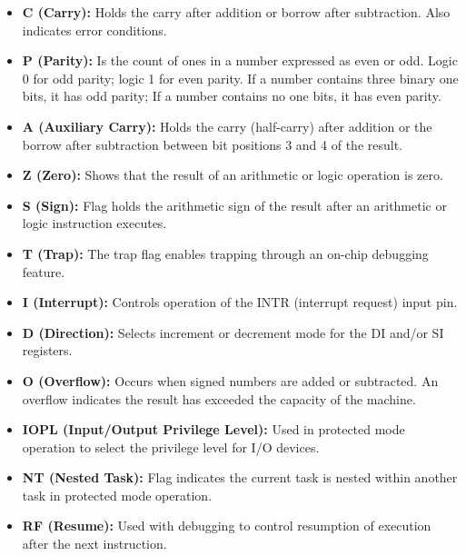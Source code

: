 \documentclass{article}
\begin{document}
\begin{itemize}
    \item \textbf{C (Carry):} Holds the carry after addition or borrow after subtraction. Also indicates error conditions.
    
    \item \textbf{P (Parity):} Is the count of ones in a number expressed as even or odd. Logic 0 for odd parity; logic 1 for even parity. If a number contains three binary one bits, it has odd parity; If a number contains no one bits, it has even parity.
    
    \item \textbf{A (Auxiliary Carry):} Holds the carry (half-carry) after addition or the borrow after subtraction between bit positions 3 and 4 of the result.
    
    \item \textbf{Z (Zero):} Shows that the result of an arithmetic or logic operation is zero.
    
    \item \textbf{S (Sign):} Flag holds the arithmetic sign of the result after an arithmetic or logic instruction executes.
    
    \item \textbf{T (Trap):} The trap flag enables trapping through an on-chip debugging feature.
    
    \item \textbf{I (Interrupt):} Controls operation of the INTR (interrupt request) input pin.
    
    \item \textbf{D (Direction):} Selects increment or decrement mode for the DI and/or SI registers.
    
    \item \textbf{O (Overflow):} Occurs when signed numbers are added or subtracted. An overflow indicates the result has exceeded the capacity of the machine.
    
    \item \textbf{IOPL (Input/Output Privilege Level):} Used in protected mode operation to select the privilege level for I/O devices.
    
    \item \textbf{NT (Nested Task):} Flag indicates the current task is nested within another task in protected mode operation.
    
    \item \textbf{RF (Resume):} Used with debugging to control resumption of execution after the next instruction.
    

\end{itemize}
\end{document}

